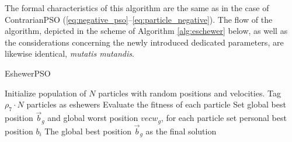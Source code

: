 {The formal characteristics of this algorithm are the same as in the case of ContrarianPSO (\ref{eq:negative_pso}--\ref{eq:particle_negative}). The flow of the algorithm, depicted in the scheme of Algorithm \ref{alg:eschewer} below, as well as the considerations concerning the newly introduced dedicated parameters, are likewise identical, \textit{mutatis mutandis}.

\enlargethispage{.1\baselineskip}
\vspace{.335em}
\begin{algorithm}[H]
\caption{EshewerPSO}\label{alg:eschewer}
Initialize population of \(N\) particles with random positions and velocities. Tag \(\rho_7 \cdot N\) particles as eshewers\;
Evaluate the fitness of each particle\;
Set global best position \(\vec{b}_g\) and global worst position \(vec{w}_g\), for each particle set personal best position \(b_i\)\;
\Return The global best position \(\vec{b}_g\) as the final solution\;
\end{algorithm}








}
